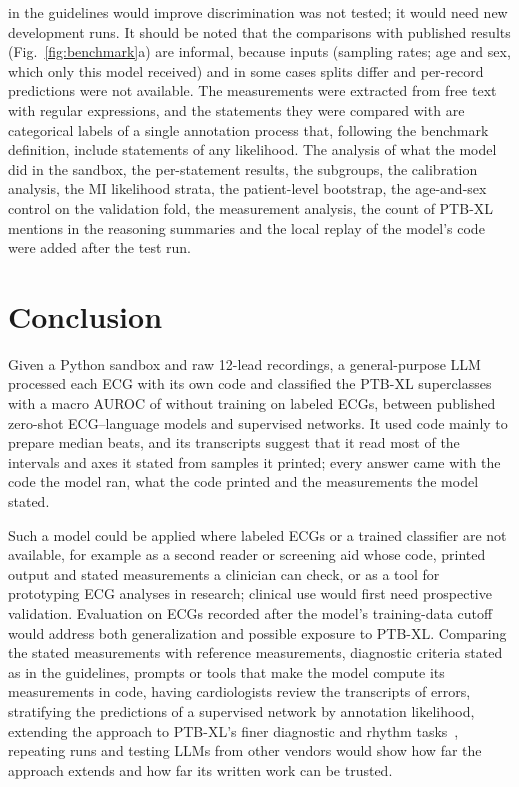 in the guidelines would improve discrimination was not tested; it would need new development runs. It should be
noted that the comparisons with published results (Fig.~\ref{fig:benchmark}a)
are informal, because inputs (sampling rates; age and sex,
which only this model received) and in some cases splits differ and per-record predictions were not available. The
measurements were extracted from free text with regular expressions, and the statements they were compared with are
categorical labels of a single annotation process that, following the benchmark definition, include statements of any
likelihood. The analysis of what the model did in the sandbox, the per-statement results, the subgroups, the calibration
analysis, the MI likelihood strata, the patient-level bootstrap, the age-and-sex control on the validation fold, the
measurement analysis, the count of PTB-XL mentions in the reasoning summaries and the local replay of the model's code
were added after the test run.

\section{Conclusion}

Given a Python sandbox and raw 12-lead recordings, a general-purpose LLM processed each ECG with its own
code and classified the PTB-XL superclasses with a macro AUROC of \MainAUROC{} without training on labeled ECGs,
between published zero-shot ECG--language models and supervised networks. It used code mainly to prepare median
beats, and its transcripts suggest that it read most of the intervals and axes it stated from samples it printed;
every answer came with the code the model ran, what the code printed and the measurements the model stated.

Such a model could be applied where labeled ECGs or a trained classifier are not available, for example as a second
reader or screening aid whose code, printed output and stated measurements a clinician can check, or as a tool for
prototyping ECG analyses in research; clinical use would first need prospective validation. Evaluation on ECGs recorded after the model's training-data cutoff would address both generalization and possible exposure
to PTB-XL. Comparing the stated measurements with reference measurements, diagnostic criteria stated as in the guidelines,
prompts or tools that make the model compute
its measurements in code, having cardiologists review the transcripts of errors, stratifying the predictions of a
supervised network by annotation likelihood, extending the approach to PTB-XL's finer diagnostic and rhythm
tasks~\citep{Strodthoff2021}, repeating runs and testing LLMs from other vendors would show how far the approach
extends and how far its written work can be trusted.
